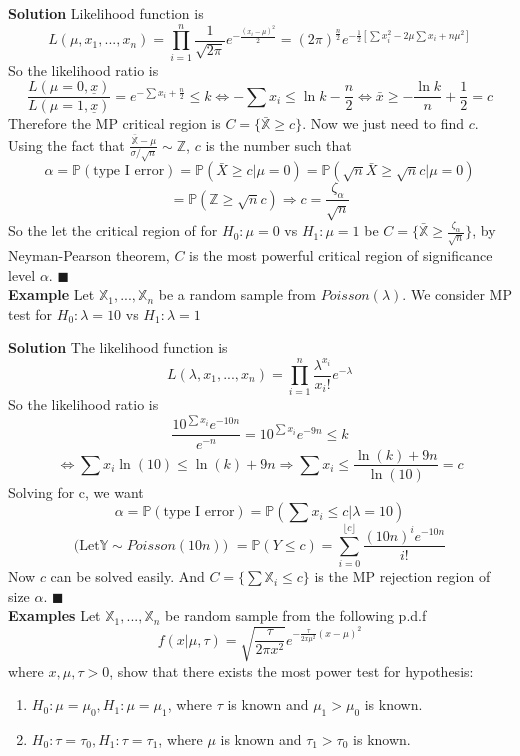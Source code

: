 \textbf{Solution} Likelihood function is
$$L(\mu, x_1, ..., x_n) = \prod_{i=1}^n \frac{1}{\sqrt{2\pi}}  e^{-\frac{(x_i-\mu)^2}{2}} = (2\pi)^{\frac{n}{2}} e^{-\frac{1}{2} [\sum x_i^2 - 2\mu\sum x_i + n\mu^2]}$$
So the likelihood ratio is
$$\frac{L(\mu = 0, \underline{x})}{L(\mu = 1, \underline{x})} = e^{-\sum x_i + \frac{n}{2}} \leq k \iff -\sum x_i \leq \ln k - \frac{n}{2} \iff \bar{x} \geq -\frac{\ln k}{n} + \frac{1}{2} = c$$
Therefore the MP critical region is $C = \{ \bar{\mathbb{X}} \geq c\}$. Now we just need to find $c$. Using the fact that $\frac{\bar{\mathbb{X}} - \mu}{\sigma/\sqrt{n}} \sim \mathbb{Z}$, $c$ is the number such that
$$\alpha = \mathbb{P}(\text{type I error}) = \mathbb{P}(\bar{X}\geq c | \mu = 0) = \mathbb{P}(\sqrt{n}\bar{X}\geq \sqrt{n}c | \mu = 0)$$
$$= \mathbb{P}(\mathbb{Z} \geq \sqrt{n}c ) \Rightarrow c = \frac{\zeta_\alpha}{\sqrt{n}}$$
So the let the critical region of for $H_0: \mu = 0$ vs $H_1: \mu=1$ be $C = \{ \bar{\mathbb{X}} \geq \frac{\zeta_\alpha}{\sqrt{n}} \}$, by Neyman-Pearson theorem, $C$ is the most powerful critical region of significance level $\alpha$. $\blacksquare$\\

\textbf{Example} Let $\mathbb{X}_1, ..., \mathbb{X}_n$ be a random sample from $Poisson(\lambda)$. We consider MP test for $H_0: \lambda = 10$ vs $H_1: \lambda=1$

\textbf{Solution} The likelihood function is
$$L(\lambda, x_1, ..., x_n) = \prod_{i=1}^n \frac{\lambda^{x_i}}{x_i!}e^{-\lambda}$$
So the likelihood ratio is
$$\frac{10^{\sum x_i} e^{-10n}}{e^{-n}} = 10^{\sum x_i} e^{-9n} \leq k$$
$$ \iff \sum x_i \ln(10) \leq \ln(k) + 9n \Rightarrow  \sum x_i  \leq \frac{\ln(k) + 9n}{\ln(10)} = c$$
Solving for c, we want
$$\alpha = \mathbb{P}(\text{type I error}) = \mathbb{P}(\sum x_i \leq c | \lambda = 10)$$
$$\text{(Let} \mathbb{Y} \sim Poisson(10n) \text{) } = \mathbb{P}(Y \leq c) = \sum_{i=0}^{\lfloor c \rfloor} \frac{(10n)^i e^{-10n}}{i!}$$
Now $c$ can be solved easily. And $C = \{\sum \mathbb{X}_i \leq c\}$ is the MP rejection region of size $\alpha$.
$\blacksquare$\\

\textbf{Examples} Let $\mathbb{X}_1, ..., \mathbb{X}_n$ be random sample from the following p.d.f
$$f(x|\mu, \tau) = \sqrt{\frac{\tau}{2\pi x^2}}e^{-\frac{\tau}{2x\mu^2}(x-\mu)^2}$$
where $x, \mu, \tau > 0$, show that there exists the most power test for hypothesis:
\begin{enumerate}
\item $H_0: \mu = \mu_0, H_1: \mu = \mu_1$, where $\tau$ is known and $\mu_1 > \mu_0$ is known.
\item $H_0: \tau = \tau_0, H_1: \tau = \tau_1$, where $\mu$ is known and $\tau_1 > \tau_0$ is known.
\end{enumerate}

